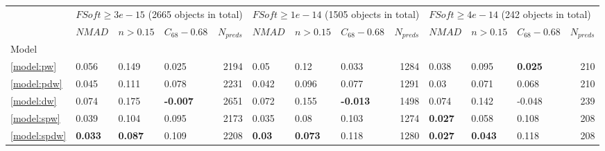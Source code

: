 \documentclass[fleqn,usenatbib]{mnras}
\begin{document}
\begin{table}
	\begin{tabular}{llllrlllrlllr}
            \hline
            {} & \multicolumn{4}{l}{$FSoft \geq 3e-15$ (2665 objects in total)} & \multicolumn{4}{l}{$FSoft \geq 1e-14$ (1505 objects in total)} & \multicolumn{4}{l}{$FSoft \geq 4e-14$ (242 objects in total)} \\
            {} &                            $NMAD$ &        $n>0.15$ &  $C_{68} - 0.68$ & $N_{preds}$ &                            $NMAD$ &        $n>0.15$ &  $C_{68} - 0.68$ & $N_{preds}$ &                           $NMAD$ &        $n>0.15$ & $C_{68} - 0.68$ & $N_{preds}$ \\
            Model          &                                   &                 &                  &             &                                   &                 &                  &             &                                  &                 &                 &             \\
            \hline
            \ref{model:pw}             &                             0.056 &           0.149 &            0.025 &        2194 &                              0.05 &            0.12 &            0.033 &        1284 &                            0.038 &           0.095 &  \textbf{0.025} &         210 \\
            \ref{model:pdw}            &                             0.045 &           0.111 &            0.078 &        2231 &                             0.042 &           0.096 &            0.077 &        1291 &                             0.03 &           0.071 &           0.068 &         210 \\
            \ref{model:dw}             &                             0.074 &           0.175 &  \textbf{-0.007} &        2651 &                             0.072 &           0.155 &  \textbf{-0.013} &        1498 &                            0.074 &           0.142 &          -0.048 &         239 \\
            \ref{model:spw}            &                             0.039 &           0.104 &            0.095 &        2173 &                             0.035 &            0.08 &            0.103 &        1274 &                   \textbf{0.027} &           0.058 &           0.108 &         208 \\
            \ref{model:spdw}           &                    \textbf{0.033} &  \textbf{0.087} &            0.109 &        2208 &                     \textbf{0.03} &  \textbf{0.073} &            0.118 &        1280 &                   \textbf{0.027} &  \textbf{0.043} &           0.118 &         208 \\

\end{tabular}
\end{table}
\end{document}
